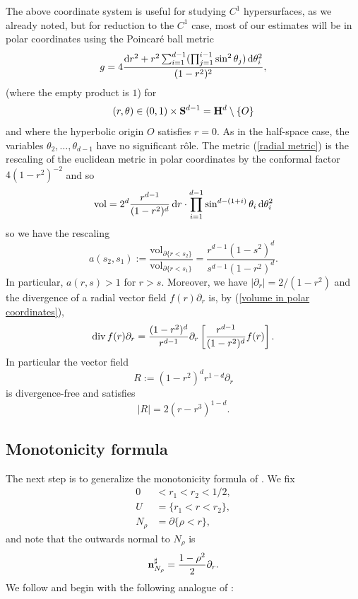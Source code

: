 The above coordinate system is useful for studying $C^1$ hypersurfaces, as we already noted, but for reduction to the $C^1$ case, most of our estimates will be in polar coordinates using the Poincar\'e ball metric
\begin{equation}\label{radial metric}
g = 4\frac{\mathop{}\!\mathrm{d} r^2 + r^2 \sum_{i=1}^{d-1} (\prod_{j=1}^{i-1} \sin^2 \theta_j) \mathop{}\!\mathrm{d}\theta_i^2}{(1 - r^2)^2},
\end{equation}
(where the empty product is $1$)
for
$$(r, \theta) \in (0, 1) \times \mathbf S^{d - 1} = \mathbf H^d \setminus \{O\}$$
and where the hyperbolic origin $O$ satisfies $r = 0$.
As in the half-space case, the variables $\theta_2, \dots, \theta_{d - 1}$ have no significant r\^ole.
The metric (\ref{radial metric}) is the rescaling of the euclidean metric in polar coordinates by the conformal factor $4(1 - r^2)^{-2}$ and so
\begin{equation}\label{volume in polar coordinates}
\mathrm{vol} = 2^d \frac{r^{d - 1}}{(1 - r^2)^d} \mathop{}\!\mathrm{d} r \cdot \prod_{i=1}^{d - 1} \sin^{d - (1 + i)} \theta_i \mathop{}\!\mathrm{d} \theta_i^2
\end{equation}
so we have the rescaling
$$a(s_2, s_1) := \frac{\mathrm{vol}_{\partial \{r < s_2\}}}{\mathrm{vol}_{\partial \{r < s_1\}}} = \frac{r^{d - 1} (1 - s^2)^d}{s^{d - 1} (1 - r^2)^d}.$$
In particular, $a(r, s) > 1$ for $r > s$.
Moreover, we have $|\partial_r| = 2/(1 - r^2)$ and the divergence of a radial vector field $f(r)\partial_r$ is, by (\ref{volume in polar coordinates}),
$$\operatorname{div} f(r)\partial_r = \frac{(1 - r^2)^d}{r^{d - 1}} \partial_r \left[\frac{r^{d - 1}}{(1 - r^2)^d} f(r)\right].$$
In particular the vector field
\begin{equation}\label{good radial vector field}
R := (1 - r^2)^d r^{1 - d} \partial_r
\end{equation}
is divergence-free and satisfies
\begin{equation}\label{radial length}
|R| = 2(r - r^3)^{1 - d}.
\end{equation}




\subsection{Monotonicity formula}
The next step is to generalize the monotonicity formula of \cite[Teorema 3.3]{Miranda66}.
We fix
\begin{align*}
0 &< r_1 < r_2 < 1/2,\\
U &= \{r_1 < r < r_2\},\\
N_\rho &= \partial \{\rho < r\},
\end{align*}
and note that the outwards normal to $N_\rho$ is
$$\mathbf n^\sharp_{N_\rho} = \frac{1 - \rho^2}{2} \partial_r.$$
We follow \cite[Chapter 5]{Giusti77} and begin with the following analogue of \cite[Lemma 5.3]{Giusti77}:

